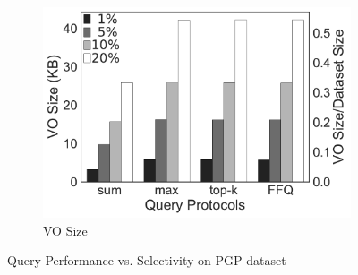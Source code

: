 \begin{figure}[t]
\begin{subfigure}[b]{.36\linewidth}
    \includegraphics[width=\linewidth]{exp-figs/aggregate-queries/pgp_vo.pdf}
    \caption{VO Size}
  \end{subfigure}
  \caption{Query Performance vs. Selectivity on PGP dataset}\label{fig:aggregate-queries:pgp}


\end{figure}

